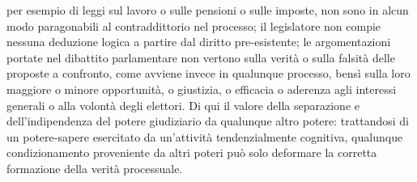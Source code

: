 per esempio di leggi sul lavoro o sulle pensioni o sulle imposte, non sono in alcun modo paragonabili al contraddittorio nel processo; il legislatore non compie nessuna deduzione logica a partire dal diritto pre-esistente; le argomentazioni portate nel dibattito parlamentare non vertono sulla verità o sulla falsità delle proposte a confronto, come avviene invece in qualunque processo, bensì sulla loro maggiore o minore opportunità, o giustizia, o efficacia o aderenza agli interessi generali o alla volontà degli elettori. Di qui il valore della separazione e dell’indipendenza del potere giudiziario da qualunque altro potere: trattandosi di un potere-sapere esercitato da un’attività tendenzialmente cognitiva, qualunque condizionamento proveniente da altri poteri può solo deformare la corretta formazione della verità processuale.

